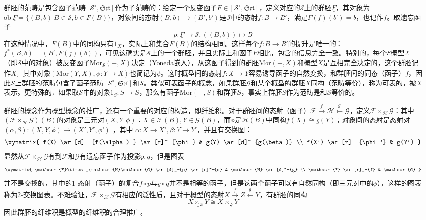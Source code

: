 群胚的范畴是包含函子范畴$ [\mathscr{S}^\circ,\mathfrak{Set}] $作为子范畴的：给定一个反变函子$ F\in [\mathscr{S}^\circ,\mathfrak{Set}] $，定义对应的$ \mathscr{S} $上的群胚$ \underline{F} $，其对象为$ \mathrm{ob}\,\underline{F}=\{(B,b)|B\in \mathscr{S},b\in F(B)\} $，对象间的态射$ (B,b)\to (B',b') $是$ \mathscr{S} $中的态射$ f:B\to B' $，满足$ F(f)(b')=b $，也记作$ f $。取遗忘函子
$$ p:\underline{F}\to \mathscr{S},((B,b))\mapsto B $$
在这种情况中，$ \underline{F}(B) $中的同构只有$ 1_X $，实际上和集合$ F(B) $的结构相同。这样每个$ f:B\to B' $的提升是唯一的：$ f^*(B,b)=(B',F(f)(b))  $，可见这确实是$ \mathscr{S} $上的一个群胚，并且实际上和函子$ F $相比，包含的信息完全一致。特别的，每个$ S $概型$ X $（即$ \mathscr{S} $中的对象）被反变函子$ \mathrm{Mor}_\mathscr{S}(-,X) $决定（Yoneda嵌入），从这函子得到的群胚$ \underline{\mathrm{Mor}(-,X)} $和概型$ X $是互相完全决定的，这个群胚记作$ \underline{X} $，其中对象$ (\mathrm{Mor}(Y,X),\phi: Y\to X) $也简记为$ \phi $。这时概型间的态射$ f:X\to Y $容易诱导函子的自然变换，和群胚间的同态（函子）$ \underline{f} $，因此$ \mathscr{S} $上群胚的范畴包含了函子范畴$ [\mathscr{S}^\circ,\mathfrak{Set}] $和$ \mathscr{S} $。类似可表函子的概念，如果群胚$ \mathscr{G} $和某个概型的群胚$ \underline{X} $同构（范畴等价），称为可表的，被$ X $表示。更特殊的，如果取$ \mathscr{S} $中的对象$ 1_S:S\to S $，那么有函子$ \mathrm{Mor}(-,S) $和群胚$ \underline{S} $，事实上群胚$ \underline{S} $作为范畴是和$ \mathscr{S} $等价的。

群胚的概念作为概型概念的推广，还有一个重要的对应的构造，即纤维积。对于群胚间的态射（函子）$ \mathscr{F}\xrightarrow{f}\mathscr{H}\xleftarrow{g}\mathscr{G} $，定义$ \mathscr{F}\times _\mathscr{H}\mathscr{G} $：其中$ (\mathscr{F}\times _\mathscr{H}\mathscr{G})(B) $的对象是三元对$ (X,Y,\phi) $：$ X\in \mathscr{F}(B),Y\in \mathscr{G}(B) $，而$ \phi $是$ \mathscr{H}(B) $中同构$ f(X)\cong g(Y) $；对象间的态射是态射对$ (\alpha,\beta):(X,Y,\phi)\to (X',Y',\phi ')$ ，其中 $\alpha:X\to X',\beta :Y\to Y' $，并且有交换图：
$$\xymatrix{
	f(X) \ar[d]_-{f(\alpha) } \ar[r]^-{\phi} & g(Y) \ar[d]^-{g(\beta)} \\
	f(X') \ar[r]_-{\phi '} & g(Y')
}$$
显然从$ \mathscr{F}\times _\mathscr{H}\mathscr{G} $有到$ \mathscr{F} $和$ \mathscr{G} $有遗忘函子作为投影$ p,q $，但是图表
$$ \xymatrix{
	\mathscr{F}\times _\mathscr{H}\mathscr{G} \ar[d]_-{p} \ar[r]^-{q} & \mathscr{H} \ar[d]^-{g} \\
	\mathscr{F} \ar[r]_-{f} & \mathscr{G}
} $$
并不是交换的，其中的1-态射（函子）的复合$ f\circ p $与$ g\circ q $并不是相等的函子，但是这两个函子可以有自然同构（即三元对中的$ \phi $），这样的图表称为2-交换图表。不难验证，$ \mathscr{F}\times_{\mathscr{H}} \mathscr{G} $有相应的泛性质，且对于概型的态射$ X\xrightarrow{f}Z\xleftarrow{g}Y $，有群胚的同构
$$ \underline{ X \times_Z Y } \cong \underline{X} \times_{\underline{Z}}\underline{Y} $$
因此群胚的纤维积是概型的纤维积的合理推广。


